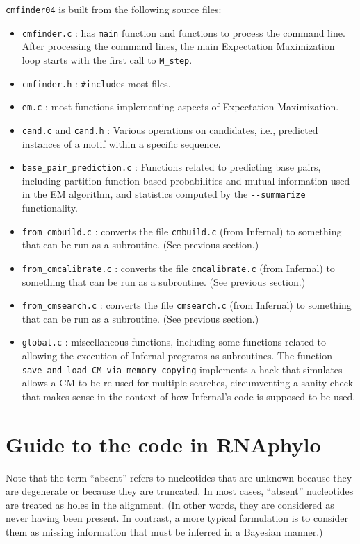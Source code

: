 \documentclass[letterpaper,12pt]{report}
\begin{document}
{\tt cmfinder04} is built from the following source files:
\begin{itemize}
\item {\tt cmfinder.c} : has {\tt main} function and functions to process the command line.  After processing the command lines, the main Expectation Maximization loop starts with the first call to {\tt M\_step}.
\item {\tt cmfinder.h} : {\tt \#include}s most files.
\item {\tt em.c} : most functions implementing aspects of Expectation Maximization.
\item {\tt cand.c} and {\tt cand.h} : Various operations on candidates, i.e., predicted instances of a motif within a specific sequence.
\item {\tt base\_pair\_prediction.c} : Functions related to predicting base pairs, including partition function-based probabilities and mutual information used in the EM algorithm, and statistics computed by the {\tt -{}-summarize} functionality.
\item {\tt from\_cmbuild.c} : converts the file {\tt cmbuild.c} (from Infernal) to something that can be run as a subroutine.  (See previous section.)
\item {\tt from\_cmcalibrate.c} : converts the file {\tt cmcalibrate.c} (from Infernal) to something that can be run as a subroutine.  (See previous section.)
\item {\tt from\_cmsearch.c} : converts the file {\tt cmsearch.c} (from Infernal) to something that can be run as a subroutine.  (See previous section.)
\item {\tt global.c} : miscellaneous functions, including some functions related to allowing the execution of Infernal programs as subroutines.
The function {\tt save\_and\_load\_CM\_via\_memory\_copying} implements a hack that simulates allows a CM to be re-used for multiple searches, circumventing a sanity check that makes sense in the context of how Infernal's code is supposed to be used.
\end{itemize}

\section{Guide to the code in RNAphylo}

Note that the term ``absent'' refers to nucleotides that are unknown because they are degenerate or because they are truncated.  In most cases, ``absent'' nucleotides are treated as holes in the alignment.  (In other words, they are considered as never having been present.  In contrast, a more typical formulation is to consider them as missing information that must be inferred in a Bayesian manner.)
\end{document}
